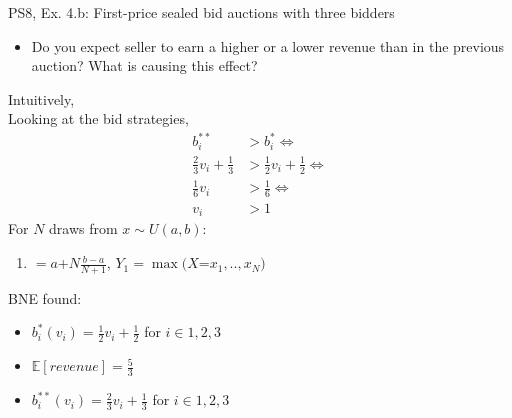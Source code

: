 \begin{frame}{PS8, Ex. 4.b: First-price sealed bid auctions with three bidders}
    \begin{itemize}
      \item[(b)] Do you expect seller to earn a higher or a lower revenue than in the previous auction? What is causing this effect?
    \end{itemize}
    \vspace{-8pt}
    \begin{multicols}{2}
    Intuitively, \\\medskip
    Looking at the bid strategies, 
    \begin{align*}
      b_i^{**}&>b_i^{*}\Leftrightarrow\\
      \frac{2}{3}v_i+\frac{1}{3}&>\frac{1}{2}v_i+\frac{1}{2}\Leftrightarrow\\
      \frac{1}{6}v_i&>\frac{1}{6}\Leftrightarrow\\
                 v_i&>1
    \end{align*}
    \vfill\null\columnbreak
    For $N$ draws from $x\sim U(a, b):$
    \vspace{-6pt}
    \begin{enumerate}
      \item[$\mathbb{E}(Y_1)$] $=a$+$N\frac{b-a}{N+1}$, $Y_1=\max(X$=$x_1,..,x_N)$
    \end{enumerate}
    \vspace{-6pt}
    BNE found:
    \begin{itemize}
      \item[(3.a)] $b_i^{*}(v_i)=\frac{1}{2}v_i+\frac{1}{2}$ for $i\in1,2,3$
      \item[(3.b)] $\mathbb{E}[revenue]=\frac{5}{3}$
      \item[(4.a)] $b_i^{**}(v_i)=\frac{2}{3}v_i+\frac{1}{3}$ for $i\in1,2,3$
    \end{itemize}
    \vfill\null
    \end{multicols}
\end{frame}
